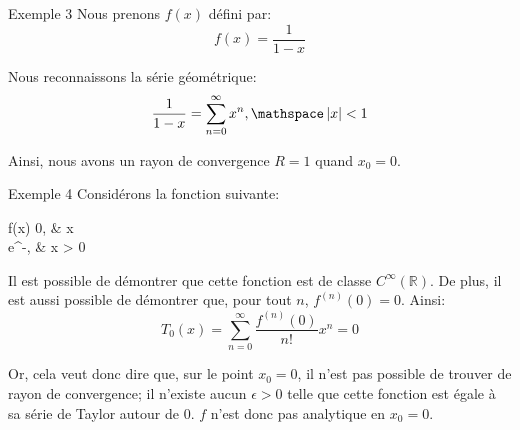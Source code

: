 \documentclass[a4paper]{article}
\begin{document}
\begin{parag}{Exemple 3}
    Nous prenons $f\left(x\right)$ défini par: 
    \[f\left(x\right) = \frac{1}{1-x}\]
    
    Nous reconnaissons la série géométrique: 
    \[\frac{1}{1-x} = \sum_{n=0}^{\infty} x^n, \mathspace \left|x\right| < 1\]

    Ainsi, nous avons un rayon de convergence $R = 1$ quand $x_0 = 0$.
\end{parag}

\begin{parag}{Exemple 4}
    Considérons la fonction suivante:
    \begin{functionbypart}{f\left(x\right)}
        0, &  x  \\
        e^{-}, &  x > 0
    \end{functionbypart}

    Il est possible de démontrer que cette fonction est de classe $C^\infty \left(\mathbb{R}\right)$. De plus, il est aussi possible de démontrer que, pour tout $n$, $f^{\left(n\right)}\left(0\right) = 0$. Ainsi:
    \[T_0\left(x\right) = \sum_{n=0}^{\infty} \frac{f^{\left(n\right)}\left(0\right)}{n!} x^n = 0\]
    
    Or, cela veut donc dire que, sur le point $x_0 = 0$, il n'est pas possible de trouver de rayon de convergence; il n'existe aucun $\epsilon > 0$ telle que cette fonction est égale à sa série de Taylor autour de 0. $f$ n'est donc pas analytique en $x_0 = 0$.
\end{parag}
\end{document}
